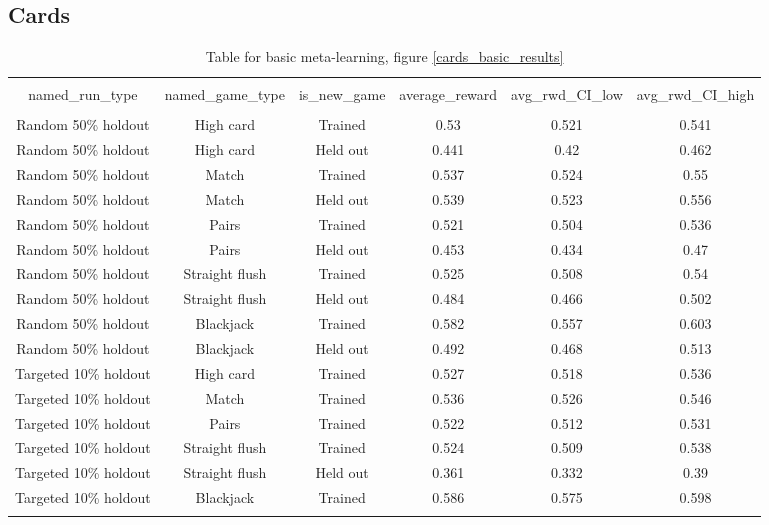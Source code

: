 \documentclass{article}
\begin{document}
\subsection{Cards}
\begin{table}[H]
\scriptsize
\centering
\begin{tabular}{@{\extracolsep{5pt}} cccccc}
\\[-1.8ex]\hline
\hline \\[-1.8ex]
named\_run\_type & named\_game\_type & is\_new\_game & average\_reward & avg\_rwd\_CI\_low & avg\_rwd\_CI\_high \\
\hline \\[-1.8ex]
Random 50\% holdout & High card & Trained & 0.53 & 0.521 & 0.541 \\
Random 50\% holdout & High card & Held out & 0.441 & 0.42 & 0.462 \\
Random 50\% holdout & Match & Trained & 0.537 & 0.524 & 0.55 \\
Random 50\% holdout & Match & Held out & 0.539 & 0.523 & 0.556 \\
Random 50\% holdout & Pairs & Trained & 0.521 & 0.504 & 0.536 \\
Random 50\% holdout & Pairs & Held out & 0.453 & 0.434 & 0.47 \\
Random 50\% holdout & Straight flush & Trained & 0.525 & 0.508 & 0.54 \\
Random 50\% holdout & Straight flush & Held out & 0.484 & 0.466 & 0.502 \\
Random 50\% holdout & Blackjack & Trained & 0.582 & 0.557 & 0.603 \\
Random 50\% holdout & Blackjack & Held out & 0.492 & 0.468 & 0.513 \\
Targeted 10\% holdout & High card & Trained & 0.527 & 0.518 & 0.536 \\
Targeted 10\% holdout & Match & Trained & 0.536 & 0.526 & 0.546 \\
Targeted 10\% holdout & Pairs & Trained & 0.522 & 0.512 & 0.531 \\
Targeted 10\% holdout & Straight flush & Trained & 0.524 & 0.509 & 0.538 \\
Targeted 10\% holdout & Straight flush & Held out & 0.361 & 0.332 & 0.39 \\
Targeted 10\% holdout & Blackjack & Trained & 0.586 & 0.575 & 0.598 \\
\hline \\[-1.8ex]
\end{tabular}
\caption{Table for basic meta-learning, figure \ref{cards_basic_results}}
\end{table}
\end{document}
